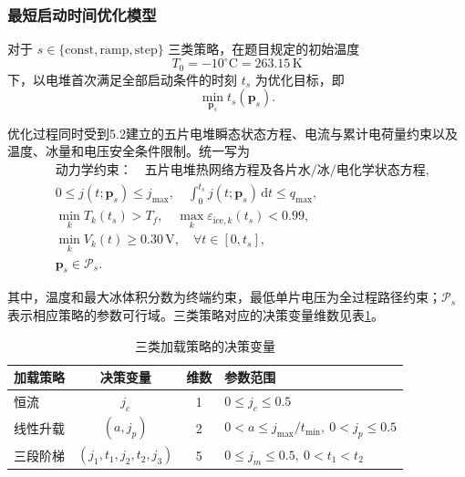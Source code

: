 \documentclass[bwprint]{gmcmthesis}
\numberwithin{equation}{section}
\numberwithin{figure}{section}
\begin{document}
\subsubsection{最短启动时间优化模型}

 对于 \(s \in \{\text{const}, \text{ramp}, \text{step}\}\) 三类策略，在题目规定的初始温度
\[
T_0 = -10^\circ\text{C} = 263.15 \, \text{K}
\]
下，以电堆首次满足全部启动条件的时刻 \(t_s\) 为优化目标，即
\begin{equation}
\min_{\mathbf{p}_s} t_s(\mathbf{p}_s). \label{eq:src:5-55}
\end{equation}

 优化过程同时受到5.2建立的五片电堆瞬态状态方程、电流与累计电荷量约束以及温度、冰量和电压安全条件限制。统一写为
\begin{equation}
\begin{aligned}
& \text{动力学约束：} \quad \text{五片电堆热网络方程及各片水/冰/电化学状态方程,} \\
& 0 \leq j(t; \mathbf{p}_s) \leq j_{\text{max}}, \quad \int_0^{t_s} j(t; \mathbf{p}_s) \, \mathrm{d}t \leq q_{\text{max}}, \\
& \min_k T_k(t_s) > T_f, \quad \max_k \varepsilon_{\text{ice},k}(t_s) < 0.99, \\
& \min_k V_k(t) \geq 0.30 \, \text{V}, \quad \forall t \in [0, t_s], \\
& \mathbf{p}_s \in \mathcal{P}_s.
\end{aligned}
\label{eq:src:5-56}
\end{equation}

 其中，温度和最大冰体积分数为终端约束，最低单片电压为全过程路径约束；\(\mathcal{P}_s\) 表示相应策略的参数可行域。三类策略对应的决策变量维数见表\ref{B90}。


\begin{table}[htbp]
    \centering
    \caption{三类加载策略的决策变量}
        \vspace{0.3cm}
        \label{B90}
    \renewcommand{\arraystretch}{1.5} %
    \begin{tabular}{l c c l}
        \toprule
        加载策略 & 决策变量 & 维数 & 参数范围 \\
        \midrule
        恒流 & \(j_c\) & 1 & \(0 \leq j_c \leq 0.5\) \\
        线性升载 & \((a, j_p)\) & 2 & \(0 < a \leq j_{\text{max}}/t_{\text{min}}, \ 0 < j_p \leq 0.5\) \\
        三段阶梯 & \((j_1, t_1, j_2, t_2, j_3)\) & 5 & \(0 \leq j_m \leq 0.5, \ 0 < t_1 < t_2\) \\
        \bottomrule
    \end{tabular}
\end{table}
\end{document}
